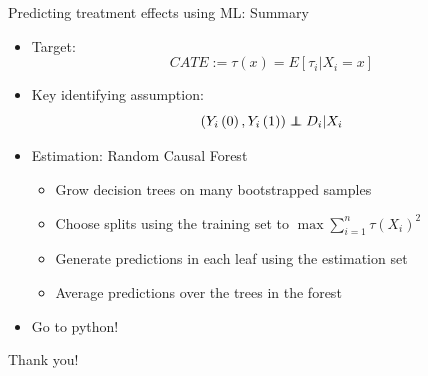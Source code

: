\documentclass{beamer}
\newcommand\independent{\protect\mathpalette{\protect\independenT}{\perp}}
\def\independenT#1#2{\mathrel{\rlap{$#1#2$}\mkern2mu{#1#2}}}
\begin{document}
\begin{frame}{Predicting treatment effects using ML: Summary}
\begin{itemize}
\item Target: \[ CATE := \tau\left(x\right) = E\left[\tau_i|X_i=x\right] \]
\item Key identifying assumption: \[ \left(Y_i\left(0\right),Y_i\left(1\right)\right) \independent D_i | X_i \]
\item Estimation: Random Causal Forest
\begin{itemize}
	\item Grow decision trees on many bootstrapped samples
	\item Choose splits using the training set to $\max \sum_{i=1}^n\tau\left(X_i\right)^2$
	\item Generate predictions in each leaf using the estimation set
	\item Average predictions over the trees in the forest
\end{itemize}
\item Go to python!
\end{itemize}
\end{frame}
\begin{frame}
\huge Thank you!
\end{frame}
\end{document}
